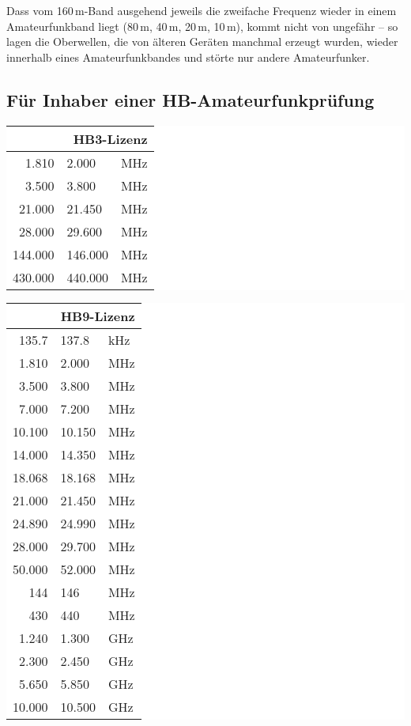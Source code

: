 Dass vom 160\,m-Band ausgehend jeweils die zweifache Frequenz wieder in einem Amateurfunkband liegt (80\,m, 40\,m, 20\,m, 10\,m), kommt nicht von ungefähr -- so lagen die Oberwellen, die von älteren Geräten manchmal erzeugt wurden, wieder innerhalb eines Amateurfunkbandes und störte nur andere Amateurfunker.

\subsection{Für Inhaber einer HB-Amateurfunkprüfung}

\begin{minipage}[t]{\textwidth}
\colorbox{white}{
\begin{minipage}[t]{.45\textwidth}
\begin{tabular}{r @{---} l l}
\multicolumn{3}{r}{\bfseries HB3-Lizenz} \\ \toprule \arrayrulecolor{rowsep}
1.810 & 2.000 & MHz \\ \midrule
3.500 & 3.800 & MHz \\ \midrule
21.000 & 21.450 & MHz \\ \midrule
28.000 & 29.600 & MHz \\ \midrule
144.000 & 146.000 & MHz \\ \midrule
430.000 & 440.000 & MHz \\ \midrule
\end{tabular}
\end{minipage}
}
\colorbox{white}{
\begin{minipage}[t]{.45\textwidth}
\begin{tabular}{r @{---} l l}
\multicolumn{3}{r}{\bfseries HB9-Lizenz} \\ \toprule \arrayrulecolor{rowsep}
 135.7 & 137.8 & kHz \\ \midrule
1.810 & 2.000 & MHz \\ \midrule
3.500 & 3.800 & MHz \\ \midrule
7.000 & 7.200 & MHz \\ \midrule
10.100 & 10.150 & MHz \\ \midrule
14.000 & 14.350 & MHz \\ \midrule
18.068 & 18.168 & MHz \\ \midrule
21.000 & 21.450 & MHz \\ \midrule
24.890 & 24.990 & MHz \\ \midrule
28.000 & 29.700 & MHz \\ \midrule
50.000 & 52.000 & MHz \\ \midrule
144 & 146 & MHz \\ \midrule
430 & 440 & MHz \\ \midrule
1.240 & 1.300 & GHz \\ \midrule
2.300 & 2.450 & GHz \\ \midrule
5.650 & 5.850 & GHz \\ \midrule
10.000 & 10.500 & GHz \\ \midrule
\end{tabular}
\end{minipage}
}
\end{minipage}

